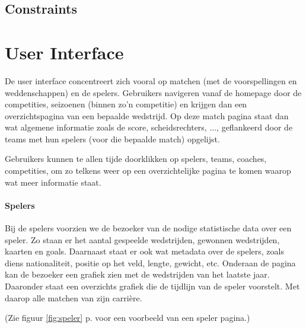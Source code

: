 \documentclass[11pt]{article}
\begin{document}
\subsection{Constraints}





\section{User Interface}


De user interface concentreert zich vooral op matchen (met de voorspellingen en weddenschappen) en de spelers.
Gebruikers navigeren vanaf de homepage door de competities, seizoenen (binnen zo'n competitie) en krijgen dan een overzichtspagina van een bepaalde wedstrijd.
Op deze match pagina staat dan wat algemene informatie zoals de score, scheidsrechters, ..., geflankeerd door de teams met hun spelers (voor die bepaalde match) opgelijst.

Gebruikers kunnen te allen tijde doorklikken op spelers, teams, coaches, competities, om zo telkens weer op een overzichtelijke pagina te komen waarop wat meer informatie staat.

\paragraph{Spelers}
Bij de spelers voorzien we de bezoeker van de nodige statistische data over een speler. Zo staan er het aantal gespeelde wedstrijden, gewonnen wedstrijden, kaarten en goals. Daarnaast staat er ook wat metadata over de spelers, zoals diens nationaliteit, positie op het veld, lengte, gewicht, etc.
Onderaan de pagina kan de bezoeker een grafiek zien met de wedstrijden van het laatste jaar. Daaronder staat een overzichts grafiek die de tijdlijn van de speler voorstelt. Met daarop alle matchen van zijn carri\`ere.

(Zie figuur \ref{fig:speler} p. \pageref{fig:speler} voor een voorbeeld van een speler pagina.)\\
\end{document}
